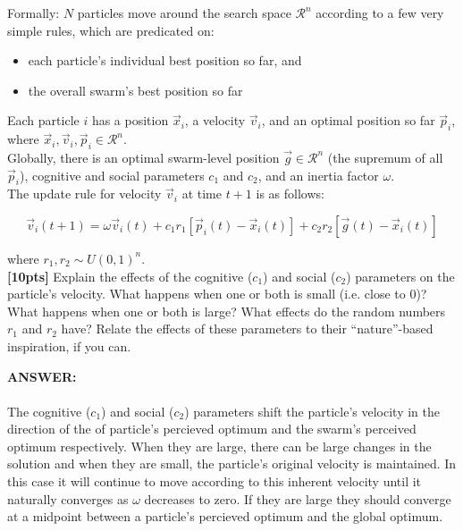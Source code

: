 \documentclass[paper=a4, fontsize=11pt]{scrartcl} %
\numberwithin{figure}{section} %
\numberwithin{table}{section} %
\begin{document}
Formally: $N$ particles move around the search space $\mathcal{R}^n$ according to a few very simple rules, which are predicated on:
\begin{itemize}
	\item each particle's individual best position so far, and
	\item the overall swarm's best position so far
\end{itemize}

Each particle $i$ has a position $\vec{x}_i$, a velocity $\vec{v}_i$, and an optimal position so far $\vec{p}_i$, where $\vec{x}_i, \vec{v}_i, \vec{p}_i \in \mathcal{R}^n$. \\

Globally, there is an optimal swarm-level position $\vec{g} \in \mathcal{R}^n$ (the supremum of all $\vec{p}_i$), cognitive and social parameters $c_1$ and $c_2$, and an inertia factor $\omega$. \\

The update rule for velocity $\vec{v}_i$ at time $t + 1$ is as follows:

$$
\vec{v}_i(t + 1) = \omega \vec{v}_i(t) + c_1 r_1 \left[ \vec{p}_i(t) - \vec{x}_i(t) \right] + c_2 r_2 \left[ \vec{g}(t) - \vec{x}_i(t) \right]
$$

where $r_1, r_2 \sim U(0, 1)^n$. \\

\textbf{[10pts]} Explain the effects of the cognitive ($c_1$) and social ($c_2$) parameters on the particle's velocity. What happens when one or both is small (i.e. close to 0)? What happens when one or both is large? What effects do the random numbers $r_1$ and $r_2$ have? Relate the effects of these parameters to their ``nature''-based inspiration, if you can. \\

\begin{addmargin}[2em]{2em}%
  \textbf{ANSWER:}\\\\
  The cognitive ($c_1$) and social ($c_2$) parameters shift the particle's velocity in the direction of the of particle's percieved optimum and the swarm's perceived optimum respectively. When they are large, there can be large changes in the solution and when they are small, the particle's original velocity is maintained. In this case it will continue to move according to this inherent velocity until it naturally converges as $\omega$ decreases to zero. If they are large they should converge at a midpoint between a particle's percieved optimum and the global optimum.
  \\
\end{addmargin}
\end{document}

